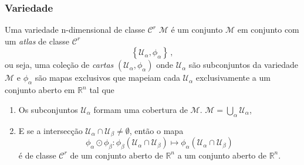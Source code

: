 \documentclass[25pt]{article}
\numberwithin{equation}{subsection} %
\newcommand{\Cop}{\mathcal{C}}
\newcommand{\Uop}{\mathcal{U}}
\newcommand{\Mop}{\mathcal{M}}
\newcommand{\Rbb}{\mathbb{R}}
\begin{document}
\subsubsection{Variedade}
Uma variedade n-dimensional de classe $\Cop^{r}$ $\Mop$ é um conjunto $\Mop$ em conjunto com um \textit{atlas} de classe $\Cop^{r}$ $$\left\{\Uop_{\alpha},\phi_{\alpha}\right\}\,,$$ ou seja, uma coleção de \textit{cartas} $\left(\Uop_{\alpha},\phi_{\alpha}\right)$ onde $\Uop_{\alpha}$ são subconjuntos da variedade $\Mop$ e $\phi_{\alpha}$ são mapas exclusivos que mapeiam cada $\Uop_{\alpha}$ exclusivamente a um conjunto aberto em $\Rbb^{n}$ tal que
\begin{enumerate}
	\item Os subconjuntos $\Uop_{\alpha}$ formam uma cobertura de $\Mop$. $\displaystyle \Mop=\bigcup_{\alpha}\Uop_{\alpha}$,
	\item E se a intersecção $\Uop_{\alpha}\cap\Uop_{\beta}\neq \emptyset$, então o mapa $$\phi_{\alpha}\odot\phi_{\beta}:\phi_{\beta}\left(\Uop_{\alpha}\cap\Uop_{\beta}\right)\mapsto\phi_{\alpha}\left(\Uop_{\alpha}\cap\Uop_{\beta}\right)$$ é de classe $\Cop^{r}$ de um conjunto aberto de $\Rbb^{n}$ a um conjunto aberto de $\Rbb^{n}$.
\end{enumerate}
\end{document}
